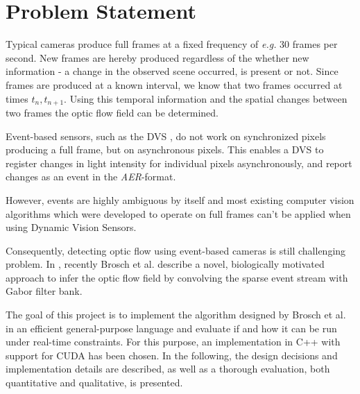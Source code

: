\documentclass[a4paper,twoside, openright,12pt]{report}
\begin{document}
\section{Problem Statement}

Typical cameras produce full frames at a fixed frequency of \emph{e.g.} 30 frames per second.
New frames are hereby produced regardless of the whether new information - a change in the observed scene occurred, is present or not.
Since frames are produced at a known interval, we know that two frames occurred at times $t_n,t_{n+1}$.
Using this temporal information and the spatial changes between two frames the optic flow field can be determined.

Event-based sensors, such as the DVS \cite{Delbruck}, do not work on synchronized pixels producing a full frame, but on asynchronous pixels.
This enables a DVS to register changes in light intensity for individual pixels asynchronously, and report changes as an event in the \textit{AER}-format.

However, events are highly ambiguous by itself and most existing computer vision algorithms which were developed to operate on full frames can't be applied when using Dynamic Vision Sensors.

Consequently, detecting optic flow using event-based cameras is still challenging problem.
In \cite{Brosch2015}, recently Brosch et al. describe a novel, biologically motivated approach to infer the optic flow field by convolving the sparse event stream with Gabor filter bank.

The goal of this project is to implement the algorithm designed by Brosch et al. in an efficient general-purpose language and evaluate if and how it can be run under real-time constraints.
For this purpose, an implementation in C++ with support for CUDA has been chosen.
In the following, the design decisions and implementation details are described, as well as a thorough evaluation, both quantitative and qualitative, is presented.



\end{document}
